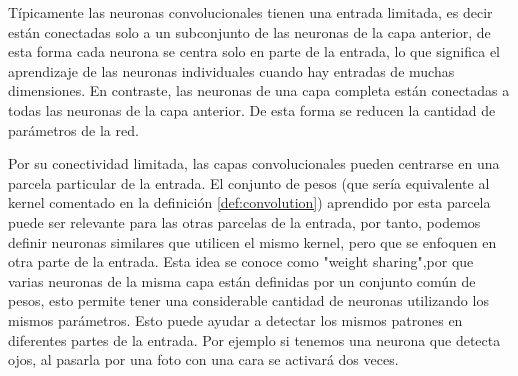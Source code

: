 \documentclass[12,twoside]{TFG-GM}
\theoremstyle{definition}
\theoremstyle{remark}
\begin{document}
Típicamente las neuronas convolucionales tienen una entrada limitada, es decir están conectadas solo a un subconjunto de las neuronas de la capa anterior, de esta forma cada neurona se centra solo en parte de la entrada, lo que significa el aprendizaje de las neuronas individuales cuando hay entradas de muchas dimensiones. En contraste, las neuronas de una capa completa están conectadas a todas las neuronas de la capa anterior. %
De esta forma se reducen la cantidad de parámetros de la red.



Por su conectividad limitada, las capas convolucionales pueden centrarse en una parcela particular de la entrada. El conjunto de pesos (que sería equivalente al kernel comentado en la definición \ref{def:convolution}) aprendido por esta parcela puede ser relevante para las otras parcelas de la entrada, por tanto, podemos definir neuronas similares que utilicen el mismo kernel, pero que se enfoquen en otra parte de la entrada. Esta idea se conoce como "weight sharing",por que varias neuronas de la misma capa están definidas por un conjunto común de pesos, esto permite tener una considerable cantidad de neuronas utilizando los mismos parámetros. Esto puede ayudar a detectar los mismos patrones en diferentes partes de la entrada. Por ejemplo si tenemos una neurona que detecta ojos, al pasarla por una foto con una cara se activará dos veces.  
\end{document}
